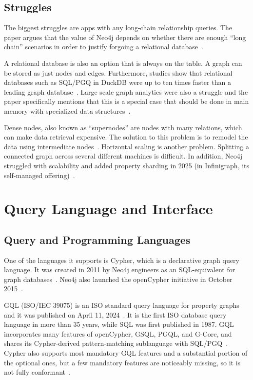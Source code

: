\documentclass[11pt,a4paper]{article}
\begin{document}
\subsection{Struggles}

The biggest struggles are apps with any long-chain relationship queries. The paper argues that the value of Neo4j depends on whether there are enough ``long chain'' scenarios in order to justify forgoing a relational database~\cite{stonebraker2024whatgoesaround}.

A relational database is also an option that is always on the table. A graph can be stored as just nodes and edges. Furthermore, studies show that relational databases such as SQL/PGQ in DuckDB were up to ten times faster than a leading graph database~\cite{stonebraker2024whatgoesaround}. Large scale graph analytics were also a struggle and the paper specifically mentions that this is a special case that should be done in main memory with specialized data structures~\cite{stonebraker2024whatgoesaround}.

Dense nodes, also known as ``supernodes'' are nodes with many relations, which can make data retrieval expensive. The solution to this problem is to remodel the data using intermediate nodes~\cite{neo4j2026modeling}. Horizontal scaling is another problem. Splitting a connected graph across several different machines is difficult. In addition, Neo4j struggled with scalability and added property sharding in 2025 (in Infinigraph, its self-managed offering)~\cite{clark2025sharding}.

\section{Query Language and Interface}

\subsection{Query and Programming Languages}

One of the languages it supports is Cypher, which is a declarative graph query language. It was created in 2011 by Neo4j engineers as an SQL-equivalent for graph databases~\cite{neo4j2026cypher}. Neo4j also launched the openCypher initiative in October 2015~\cite{malenchino2024opencypher}.

GQL (ISO/IEC 39075) is an ISO standard query language for property graphs and it was published on April 11, 2024~\cite{malenchino2024opencypher,hare2024gql}. It is the first ISO database query language in more than 35 years, while SQL was first published in 1987. GQL incorporates many features of openCypher, GSQL, PGQL, and G-Core, and shares its Cypher-derived pattern-matching sublanguage with SQL/PGQ~\cite{hare2024gql}. Cypher also supports most mandatory GQL features and a substantial portion of the optional ones, but a few mandatory features are noticeably missing, so it is not fully conformant~\cite{neo4j2026gqlconformance}.
\end{document}
